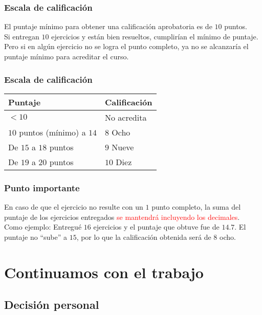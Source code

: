 \documentclass[12pt]{beamer}
\begin{document}
\begin{frame}
\frametitle{Escala de calificación}
El puntaje mínimo para obtener una calificación aprobatoria es de $10$ puntos.
\\
\bigskip
\pause
Si entregan $10$ ejercicios y están bien resueltos, cumplirían el mínimo de puntaje. \pause Pero si en algún ejercicio no se logra el punto completo, ya no se alcanzaría el puntaje mínimo para acreditar el curso.
\end{frame}
\begin{frame}
\frametitle{Escala de calificación}
\begin{table}
\centering
\begin{tabular}{l | l}
Puntaje & Calificación \\ \hline
$< 10$ & No acredita \\ \pause
$10$ puntos (mínimo) a $14$ & $8$ Ocho \\ \pause
De $15$  a $18$ puntos & $9$ Nueve \\ \pause
De $19$  a $20$ puntos & $10$ Diez \\
\end{tabular}
\end{table}
\end{frame}
\begin{frame}
\frametitle{Punto importante}
En caso de que el ejercicio no resulte con un $1$ punto completo, la suma del puntaje de los ejercicios entregados \textcolor{red}{se mantendrá incluyendo los decimales}.
\\
\bigskip
\pause
Como ejemplo: Entregué $16$ ejercicios y el puntaje que obtuve fue de $14.7$. \pause El puntaje no \enquote{sube} a $15$, por lo que la calificación obtenida será de $8$ ocho.
\end{frame}

\section{Continuamos con el trabajo}
\subsection{Decisión personal}
\end{document}
